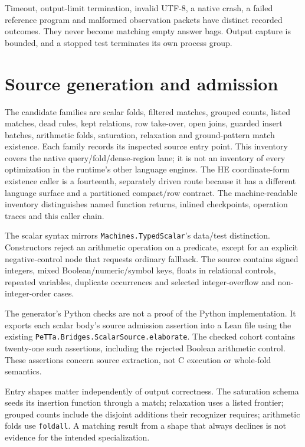 \documentclass[11pt,a4paper]{article}
\newcommand{\code}[1]{\nolinkurl{#1}}
\begin{document}
Timeout, output-limit termination, invalid UTF-8, a native crash, a failed
reference program and malformed observation packets have distinct recorded
outcomes. They never become matching empty answer bags. Output capture is
bounded, and a stopped test terminates its own process group.

\section{Source generation and admission}

The candidate families are scalar folds, filtered matches, grouped counts,
listed matches, dead rules, kept relations, row take-over, open joins,
guarded insert batches, arithmetic folds, saturation, relaxation and
ground-pattern match existence.
Each family records its inspected source entry point. This inventory covers
the native query/fold/dense-region lane; it is not an inventory of every
optimization in the runtime's other language engines.
The HE coordinate-form existence caller is a fourteenth, separately driven
route because it has a different language surface and a partitioned
compact/row contract. The machine-readable inventory distinguishes named
function returns, inlined checkpoints, operation traces and this caller chain.

The scalar syntax mirrors \code{Machines.TypedScalar}'s data/test distinction.
Constructors reject an arithmetic operation on a predicate, except for an
explicit negative-control node that requests ordinary fallback. The source
contains signed integers, mixed Boolean/numeric/symbol keys, floats in
relational controls, repeated variables, duplicate occurrences and selected
integer-overflow and non-integer-order cases.

The generator's Python checks are not a proof of the Python implementation.
It exports each scalar body's source admission assertion into a Lean file
using the existing \code{PeTTa.Bridges.ScalarSource.elaborate}. The checked
cohort contains twenty-one such assertions, including the rejected Boolean
arithmetic control. These assertions concern source extraction, not C
execution or whole-fold semantics.

Entry shapes matter independently of output correctness. The saturation
schema seeds its insertion function through a match; relaxation uses a listed
frontier; grouped counts include the disjoint additions their recognizer
requires; arithmetic folds use \code{foldall}. A matching result from a shape
that always declines is not evidence for the intended specialization.
\end{document}
